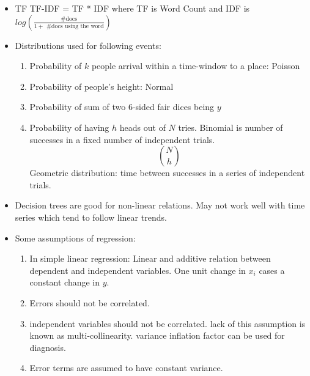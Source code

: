 \begin{itemize}
\item TF TF-IDF = TF * IDF where TF is Word Count and IDF is $log(\frac{\text{\# docs}}{1 + \text{ \# docs using the word}})$

\item Distributions used for following events:
    \begin{enumerate}
        \item Probability of $k$ people arrival within a 
        time-window to a place: Poisson
        \item Probability of people's height: Normal
        
        \item Probability of sum of two 6-sided fair dices being $y$
        
        \item Probability of having $h$ heads out of $N$ tries.
        Binomial is number of successes in a fixed number of 
        independent trials. \[\binom{N}{h}\]
        Geometric distribution: time between successes in a series of
        independent trials.
     \end{enumerate}

\item Decision trees are good for non-linear relations. May not 
work well with time series which tend to follow linear trends.

\item Some assumptions of regression:
            \begin{enumerate}
                  \item In simple linear regression: 
                           Linear and additive relation between 
                          dependent and independent variables.
                          One unit change in $x_i$ cases a constant 
                          change in $y$. 
                          
                          \item Errors should not be correlated.
                          
                          \item independent variables should not be correlated.
                          lack of this assumption is known as multi-collinearity.
                          variance inflation factor can be used for diagnosis.
                          
                          \item  Error terms are assumed to have
                          constant variance. 
                          

\end{enumerate}
\end{itemize}
